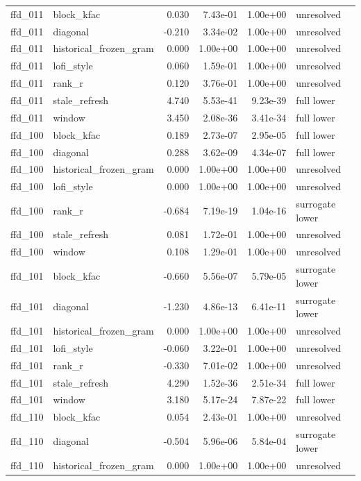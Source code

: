 \begin{table}[p]
\begin{tabular}{llrrrl}
ffd\_011 & block\_kfac & 0.030 & 7.43e-01 & 1.00e+00 & unresolved \\
ffd\_011 & diagonal & -0.210 & 3.34e-02 & 1.00e+00 & unresolved \\
ffd\_011 & historical\_frozen\_gram & 0.000 & 1.00e+00 & 1.00e+00 & unresolved \\
ffd\_011 & lofi\_style & 0.060 & 1.59e-01 & 1.00e+00 & unresolved \\
ffd\_011 & rank\_r & 0.120 & 3.76e-01 & 1.00e+00 & unresolved \\
ffd\_011 & stale\_refresh & 4.740 & 5.53e-41 & 9.23e-39 & full lower \\
ffd\_011 & window & 3.450 & 2.08e-36 & 3.41e-34 & full lower \\
ffd\_100 & block\_kfac & 0.189 & 2.73e-07 & 2.95e-05 & full lower \\
ffd\_100 & diagonal & 0.288 & 3.62e-09 & 4.34e-07 & full lower \\
ffd\_100 & historical\_frozen\_gram & 0.000 & 1.00e+00 & 1.00e+00 & unresolved \\
ffd\_100 & lofi\_style & 0.000 & 1.00e+00 & 1.00e+00 & unresolved \\
ffd\_100 & rank\_r & -0.684 & 7.19e-19 & 1.04e-16 & surrogate lower \\
ffd\_100 & stale\_refresh & 0.081 & 1.72e-01 & 1.00e+00 & unresolved \\
ffd\_100 & window & 0.108 & 1.29e-01 & 1.00e+00 & unresolved \\
ffd\_101 & block\_kfac & -0.660 & 5.56e-07 & 5.79e-05 & surrogate lower \\
ffd\_101 & diagonal & -1.230 & 4.86e-13 & 6.41e-11 & surrogate lower \\
ffd\_101 & historical\_frozen\_gram & 0.000 & 1.00e+00 & 1.00e+00 & unresolved \\
ffd\_101 & lofi\_style & -0.060 & 3.22e-01 & 1.00e+00 & unresolved \\
ffd\_101 & rank\_r & -0.330 & 7.01e-02 & 1.00e+00 & unresolved \\
ffd\_101 & stale\_refresh & 4.290 & 1.52e-36 & 2.51e-34 & full lower \\
ffd\_101 & window & 3.180 & 5.17e-24 & 7.87e-22 & full lower \\
ffd\_110 & block\_kfac & 0.054 & 2.43e-01 & 1.00e+00 & unresolved \\
ffd\_110 & diagonal & -0.504 & 5.96e-06 & 5.84e-04 & surrogate lower \\
ffd\_110 & historical\_frozen\_gram & 0.000 & 1.00e+00 & 1.00e+00 & unresolved \\

\end{tabular}
\end{table}
